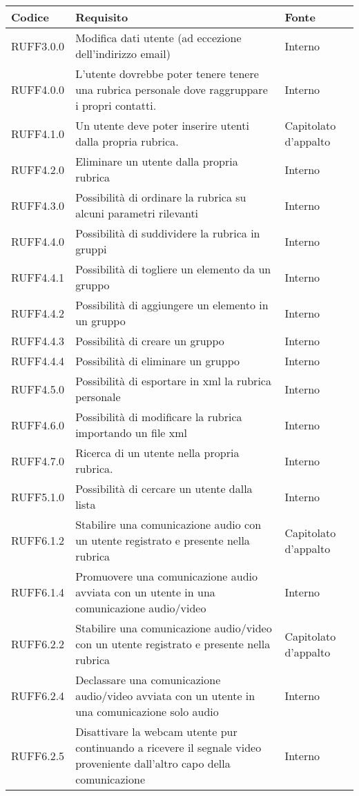 \begin{longtable}{lp{}l}
\toprule Codice & Requisito & Fonte\\
\midrule
RUFF3.0.0 & Modifica dati utente (ad eccezione dell'indirizzo email) & Interno \\
RUFF4.0.0 & L'utente dovrebbe poter tenere tenere una rubrica personale dove raggruppare i propri contatti. & Interno \\
RUFF4.1.0 & Un utente deve poter inserire utenti dalla propria rubrica. & Capitolato d'appalto \\
RUFF4.2.0 & Eliminare un utente dalla propria rubrica & Interno \\
RUFF4.3.0 & Possibilità di ordinare la rubrica su alcuni parametri rilevanti & Interno \\
RUFF4.4.0 & Possibilità di suddividere la rubrica in gruppi & Interno \\
RUFF4.4.1 & Possibilità di togliere un elemento da un gruppo & Interno \\
RUFF4.4.2 & Possibilità di aggiungere un elemento in un gruppo & Interno \\
RUFF4.4.3 & Possibilità di creare un gruppo & Interno \\
RUFF4.4.4 & Possibilità di eliminare un gruppo & Interno \\
RUFF4.5.0 & Possibilità di esportare in xml la rubrica personale & Interno \\
RUFF4.6.0 & Possibilità di modificare la rubrica importando un file xml & Interno \\
RUFF4.7.0 & Ricerca di un utente nella propria rubrica. & Interno \\
RUFF5.1.0 & Possibilità di cercare un utente dalla lista & Interno \\
RUFF6.1.2 & Stabilire una comunicazione audio con un utente registrato e presente nella rubrica & Capitolato d'appalto \\
RUFF6.1.4 & Promuovere una comunicazione audio avviata con un utente in una comunicazione audio/video & Interno \\
RUFF6.2.2 & Stabilire una comunicazione audio/video con un utente registrato e presente nella rubrica & Capitolato d'appalto \\
RUFF6.2.4 & Declassare una comunicazione audio/video avviata con un utente in una comunicazione solo audio & Interno \\
RUFF6.2.5 & Disattivare la webcam utente pur continuando a ricevere il segnale video proveniente dall'altro capo della comunicazione & Interno \\

\end{longtable}
